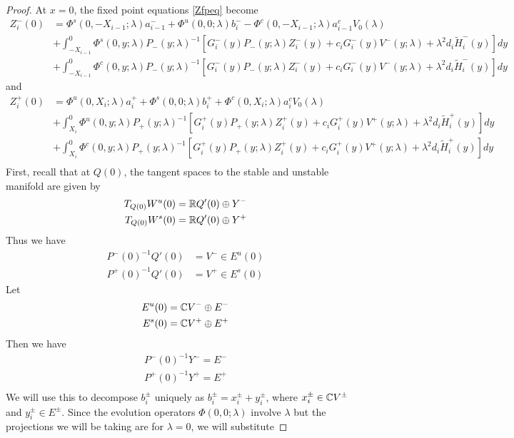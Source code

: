 \documentclass[thesis.tex]{subfiles}
\begin{document}
\begin{lemma}
\begin{proof}
At $x = 0$, the fixed point equations \eqref{Zfpeq} become
\begin{align*}
Z_i^-(0) &= \Phi^s(0, -X_{i-1}; \lambda) a_{i-1}^- + \Phi^u(0, 0; \lambda) b_i^- -\Phi^c(0, -X_{i-1}; \lambda) a_{i-1}^c V_0(\lambda) \\
&+ \int_{-X_{i-1}}^0 \Phi^s(0, y; \lambda)P_-(y; \lambda)^{-1} [ G_i^-(y) P_-(y; \lambda) Z_i^-(y) + c_i G_i^-(y) V^-(y; \lambda) + \lambda^2 d_i \tilde{H}_i^-(y)] dy \\
&+ \int_{-X_{i-1}}^0 \Phi^c(0, y; \lambda) P_-(y; \lambda)^{-1} [ G_i^-(y) P_-(y; \lambda) Z_i^-(y) + c_i G_i^-(y) V^-(y; \lambda) + \lambda^2 d_i \tilde{H}_i^-(y)] dy
\end{align*}
and
\begin{align*}
Z_i^+(0) &= \Phi^u(0, X_i; \lambda) a_i^+ + \Phi^s(0, 0; \lambda) b_i^+ + \Phi^c(0, X_i; \lambda) a_i^c V_0(\lambda) \\
&+ \int_{X_i}^0 \Phi^u(0, y; \lambda) P_+(y; \lambda)^{-1} [ G_i^+(y) P_+(y; \lambda) Z_i^+(y) + c_i G_i^+(y) V^+(y; \lambda) + \lambda^2 d_i \tilde{H}_i^+(y)] dy \\
&+ \int_{X_i}^0 \Phi^c(0, y; \lambda) P_+(y; \lambda)^{-1} [ G_i^+(y) P_+(y; \lambda) Z_i^+(y) + c_i G_i^+(y) V^+(y; \lambda) + \lambda^2 d_i \tilde{H}_i^+(y)] dy \\
\end{align*}
First, recall that at $Q(0)$, the tangent spaces to the stable and unstable manifold are given by
\begin{align*}
T_{Q(0)} W^u(0) &= \mathbb{R} Q'(0) \oplus Y^- \\
T_{Q(0)} W^s(0) &= \mathbb{R} Q'(0) \oplus Y^+
\end{align*}
Thus we have
\begin{align*}
P^-(0)^{-1} Q'(0) &= V^- \in E^u(0) \\
P^+(0)^{-1} Q'(0) &= V^+ \in E^s(0)
\end{align*}
Let
\begin{align*}
E^u(0) &= \mathbb{C} V^- \oplus E^- \\
E^s(0) &= \mathbb{C} V^+ \oplus E^+ \\
\end{align*}
Then we have
\begin{align*}
P^-(0)^{-1} Y^- = E^- \\
P^+(0)^{-1} Y^+ = E^+ \\
\end{align*}
We will use this to decompose $b_i^\pm$ uniquely as $b_i^\pm = x_i^\pm + y_i^\pm$, where $x_i^\pm \in \mathbb{C} V^\pm$ and $y_i^\pm \in E^\pm$. Since the evolution operators $\Phi(0, 0; \lambda)$ involve $\lambda$ but the projections we will be taking are for $\lambda = 0$, we will substitute

\end{proof}
\end{lemma}
\end{document}
